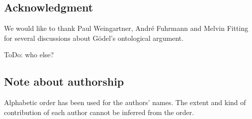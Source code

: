\documentclass{birkjour}
\theoremstyle{definition}
\theoremstyle{remark}
\numberwithin{equation}{section}
\def\HOML{\entity{HOML}\xspace}
\begin{document}



\subsection*{Acknowledgment}

We would like to thank Paul Weingartner, Andr\'{e} Fuhrmann and Melvin Fitting for several discussions about G\"odel's ontological argument.

ToDo: who else?

\subsection*{Note about authorship}

Alphabetic order has been used for the authors' names. The extent and
kind of contribution of each author cannot be inferred from the order.










\end{document}
